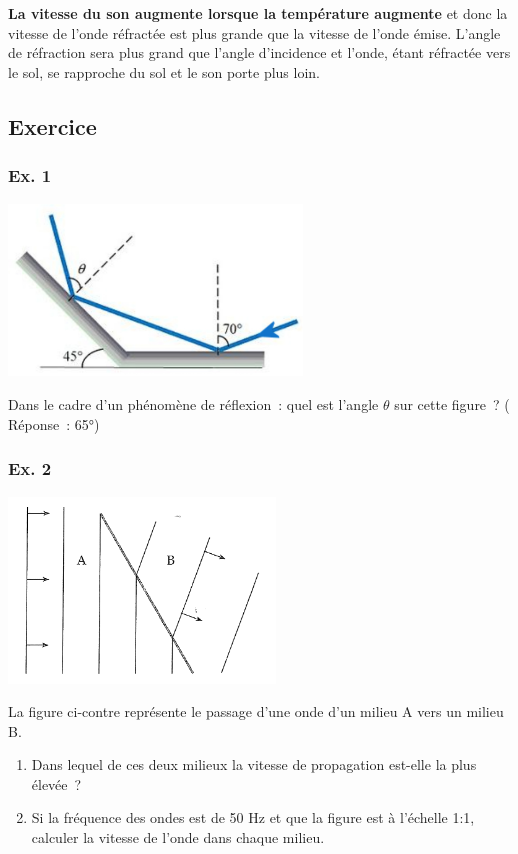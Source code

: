 \textbf{La vitesse du son augmente lorsque la température augmente} et
donc la vitesse de l'onde réfractée est plus grande que la vitesse de
l'onde émise. L'angle de réfraction sera plus grand que l'angle
d'incidence et l'onde, étant réfractée vers le sol, se rapproche du sol
et le son porte plus loin.

\subsection{Exercice}

\subsubsection{Ex. 1}
\includegraphics[width=7.807cm,height=4.581cm]{Pictures/10000001000004570000028CCC770E758E0BAEF3.png}

Dans
le cadre d'un phénomène de réflexion~: quel est l'angle $\theta$ sur cette
figure~? ( Réponse~: 65°)

\subsubsection{Ex. 2 }

\includegraphics[width=7.086cm,height=4.948cm]{Pictures/10000001000003620000025DC72F2F5C1B5B30DC.png}

La
figure ci-contre représente le passage d'une onde d'un milieu A vers un
milieu B.
\begin{enumerate}
	\item Dans lequel de ces deux milieux la vitesse de propagation est-elle la
	plus élevée~?
	\item  Si la fréquence des ondes est de 50 Hz et que la figure est à
	l'échelle 1:1, calculer la vitesse de l'onde dans chaque milieu.
\end{enumerate}

